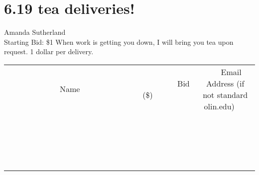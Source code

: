 \documentclass[11pt]{article}
\begin{document}
\section*{6.19 tea deliveries! }
Amanda Sutherland
\\
Starting Bid: \$1
\newline
When work is getting you down, I will bring you tea upon request. 1 dollar per delivery.
\\[3ex]
\begin{tabular}{c c c}
~~~~~~~~~~~~~Name~~~~~~~~~~~~~ & ~~~~~~~~~Bid (\$)~~~~~~~~~  & ~~~Email Address (if not standard olin.edu)~~~\\
 & & \\
\hline
 & & \\
\hline
 & & \\
\hline
 & & \\
\hline
 & & \\
\hline
 & & \\
\hline
 & & \\
\hline
 & & \\
\hline
 & & \\
\hline
 & & \\
\hline
 & & \\
\hline
 & & \\
\hline
 & & \\
\hline
 & & \\
\hline
 & & \\
\hline
 & & \\
\hline
 & & \\
\hline
 & & \\
\hline
 & & \\
\hline
\end{tabular}
\newpage
\end{document}
